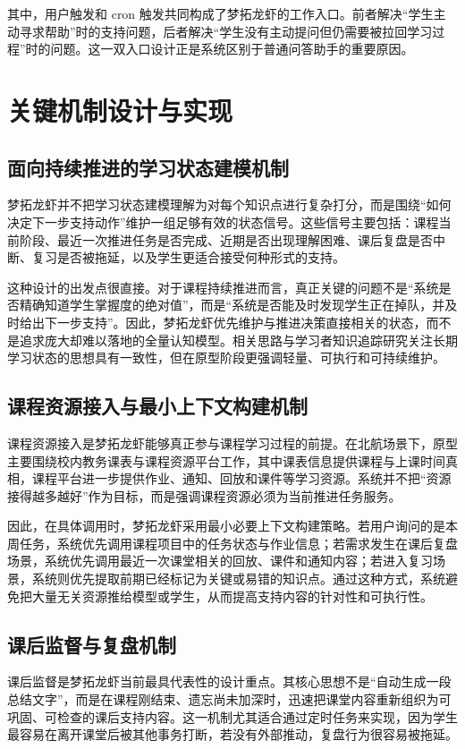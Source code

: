 \documentclass[zihao=-4]{ctexart}
\begin{document}
其中，用户触发和 cron 触发共同构成了梦拓龙虾的工作入口。前者解决“学生主动寻求帮助”时的支持问题，后者解决“学生没有主动提问但仍需要被拉回学习过程”时的问题。这一双入口设计正是系统区别于普通问答助手的重要原因。

\section{关键机制设计与实现}
\subsection{面向持续推进的学习状态建模机制}
梦拓龙虾并不把学习状态建模理解为对每个知识点进行复杂打分，而是围绕“如何决定下一步支持动作”维护一组足够有效的状态信号。这些信号主要包括：课程当前阶段、最近一次推进任务是否完成、近期是否出现理解困难、课后复盘是否中断、复习是否被拖延，以及学生更适合接受何种形式的支持。

这种设计的出发点很直接。对于课程持续推进而言，真正关键的问题不是“系统是否精确知道学生掌握度的绝对值”，而是“系统是否能及时发现学生正在掉队，并及时给出下一步支持”。因此，梦拓龙虾优先维护与推进决策直接相关的状态，而不是追求庞大却难以落地的全量认知模型。相关思路与学习者知识追踪研究关注长期学习状态的思想具有一致性\cite{corbett1994}，但在原型阶段更强调轻量、可执行和可持续维护。

\subsection{课程资源接入与最小上下文构建机制}
课程资源接入是梦拓龙虾能够真正参与课程学习过程的前提。在北航场景下，原型主要围绕校内教务课表与课程资源平台工作，其中课表信息提供课程与上课时间真相，课程平台进一步提供作业、通知、回放和课件等学习资源。系统并不把“资源接得越多越好”作为目标，而是强调课程资源必须为当前推进任务服务。

因此，在具体调用时，梦拓龙虾采用最小必要上下文构建策略。若用户询问的是本周任务，系统优先调用课程项目中的任务状态与作业信息；若需求发生在课后复盘场景，系统优先调用最近一次课堂相关的回放、课件和通知内容；若进入复习场景，系统则优先提取前期已经标记为关键或易错的知识点。通过这种方式，系统避免把大量无关资源推给模型或学生，从而提高支持内容的针对性和可执行性。

\subsection{课后监督与复盘机制}
课后监督是梦拓龙虾当前最具代表性的设计重点。其核心思想不是“自动生成一段总结文字”，而是在课程刚结束、遗忘尚未加深时，迅速把课堂内容重新组织为可巩固、可检查的课后支持内容。这一机制尤其适合通过定时任务来实现，因为学生最容易在离开课堂后被其他事务打断，若没有外部推动，复盘行为很容易被拖延。
\end{document}
